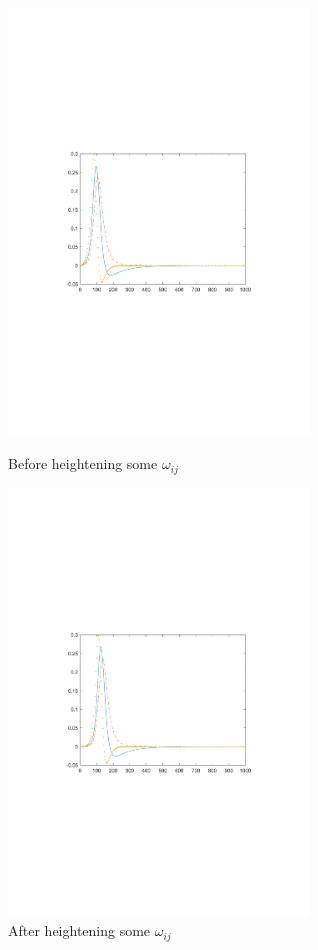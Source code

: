 \documentclass{mcmthesis}
\begin{document}
\begin{figure}[htbp!]
  \begin{flushleft}
  	\begin{minipage}[t]{0.3\textwidth}
  \centering
  \includegraphics[width=8cm]{figures/figure_292}
  \caption{Before heightening some $\omega_{ij}$}
  \end{minipage}
  \qquad\qquad\qquad\qquad
  	\begin{minipage}[t]{0.3\textwidth}
  \centering
  \includegraphics[width=8cm]{figures/figure_291}
  \caption{After heightening some $\omega_{ij}$}
  \end{minipage}
  \end{flushleft}
  
\end{figure}
\end{document}
